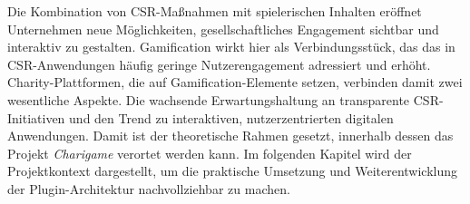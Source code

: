 Die Kombination von CSR-Maßnahmen mit spielerischen Inhalten eröffnet Unternehmen neue Möglichkeiten, gesellschaftliches Engagement sichtbar und interaktiv zu gestalten.
Gamification wirkt hier als Verbindungsstück, das das in CSR-Anwendungen häufig geringe Nutzerengagement adressiert und erhöht.
Charity-Plattformen, die auf Gamification-Elemente setzen, verbinden damit zwei wesentliche Aspekte.
Die wachsende Erwartungshaltung an transparente CSR-Initiativen und den Trend zu interaktiven, nutzerzentrierten digitalen Anwendungen.
Damit ist der theoretische Rahmen gesetzt, innerhalb dessen das Projekt \textit{Charigame} verortet werden kann.
Im folgenden Kapitel wird der Projektkontext dargestellt, um die praktische Umsetzung und Weiterentwicklung der Plugin-Architektur nachvollziehbar zu machen.